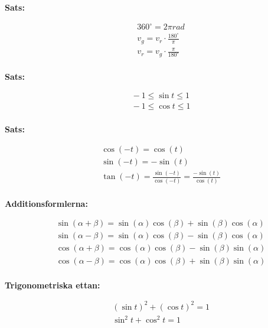 \newpage

\textbf{Sats:}\par
\begin{align*}
  &\quad 360^\circ = 2\pi rad \\
  &\quad v_{g} = v_{r} \cdot \frac{180^\circ}{\pi} \\
  &\quad v_{r} = v_{g} \cdot \frac{\pi}{180^\circ} \\
\end{align*}

\textbf{Sats:}\par
\begin{align*}
  &\quad -1 \leq \sin{t} \leq 1 \\
  &\quad -1 \leq \cos{t} \leq 1 \\
\end{align*}

\textbf{Sats:}\par
\begin{align*}
  &\quad \cos{(-t)} = \cos{(t)} \\
  &\quad \sin{(-t)} = -\sin{(t)} \\
  &\quad \tan{(-t)} = \frac{\sin{(-t)}}{\cos{(-t)}} = \frac{-\sin{(t)}}{\cos{(t)}} \\
\end{align*}

\textbf{Additionsformlerna:}\par
\begin{align*}
  &\quad \sin{(\alpha + \beta)} = \sin{(\alpha)}\cos{(\beta)} + \sin{(\beta)}\cos{(\alpha)} \\
  &\quad \sin{(\alpha - \beta)} = \sin{(\alpha)}\cos{(\beta)} - \sin{(\beta)}\cos{(\alpha)} \\
  &\quad \cos{(\alpha + \beta)} = \cos{(\alpha)}\cos{(\beta)} - \sin{(\beta)}\sin{(\alpha)} \\
  &\quad \cos{(\alpha - \beta)} = \cos{(\alpha)}\cos{(\beta)} + \sin{(\beta)}\sin{(\alpha)} \\ 
\end{align*}

\textbf{Trigonometriska ettan:}\par
\begin{align*}
  &\quad (\sin{t})^{2} + (\cos{t})^{2} = 1 \\
  &\quad \sin^{2}{t} + \cos^{2}{t} = 1 \\ 
\end{align*}


